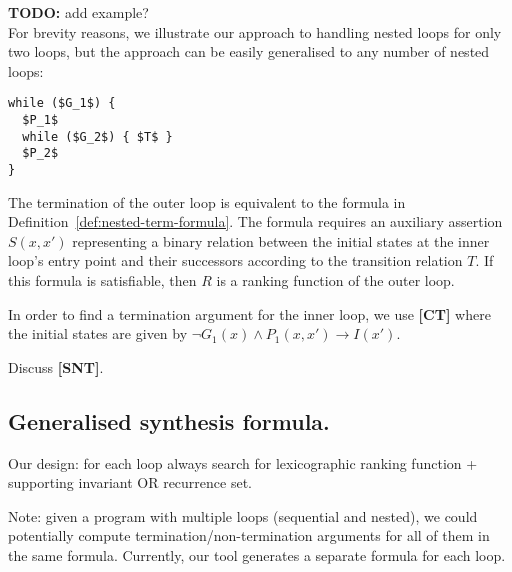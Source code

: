 \documentclass[preprint]{sigplanconf}
\theoremstyle{definition}
\newcommand{\todo}[1]{{\bf TODO:} #1}
\begin{document}
\todo{add example?}\\

For brevity reasons, we illustrate our approach to handling nested loops for only two loops, but the approach can be easily generalised to any number of nested loops:
\begin{lstlisting}[mathescape=true]
while ($G_1$) { 
  $P_1$ 
  while ($G_2$) { $T$ }
  $P_2$
}
\end{lstlisting}

The termination of the outer loop is equivalent to the formula in Definition~\ref{def:nested-term-formula}.
The formula requires an auxiliary assertion $S(x,x')$ representing a binary relation between the initial states at the inner loop's entry point
and their successors according to the transition relation $T$. If this formula is satisfiable, then $R$ is a ranking function of the outer loop.

In order to find a termination argument for the inner loop, we use {\bf [CT]} where the initial states are given by 
$\neg G_1(x) \wedge P_1(x,x') \rightarrow I(x')$.


Discuss {\bf [SNT]}.\\

\fi

\subsection{Generalised synthesis formula.}
Our design: for each loop always search for lexicographic ranking function + supporting invariant OR recurrence set.

Note: given a program with multiple loops (sequential and nested), we could potentially compute termination/non-termination 
arguments for all of them in the same formula. Currently, our tool generates a separate formula for each loop.


\end{document}
